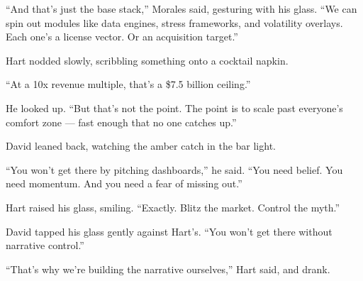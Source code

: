 \medskip

``And that’s just the base stack,'' Morales said, gesturing with his glass.  
``We can spin out modules like data engines, stress frameworks, and volatility overlays.  
Each one’s a license vector. Or an acquisition target.''

Hart nodded slowly, scribbling something onto a cocktail napkin.

``At a 10x revenue multiple, that’s a \$7.5 billion ceiling.''

He looked up. ``But that’s not the point.  
The point is to scale past everyone’s comfort zone — fast enough that no one catches up.''

David leaned back, watching the amber catch in the bar light.

``You won’t get there by pitching dashboards,'' he said.  
``You need belief. You need momentum. And you need a fear of missing out.''

Hart raised his glass, smiling. ``Exactly. Blitz the market. Control the myth.''

David tapped his glass gently against Hart’s. ``You won’t get there without narrative control.''

``That’s why we’re building the narrative ourselves,'' Hart said, and drank.


\medskip

